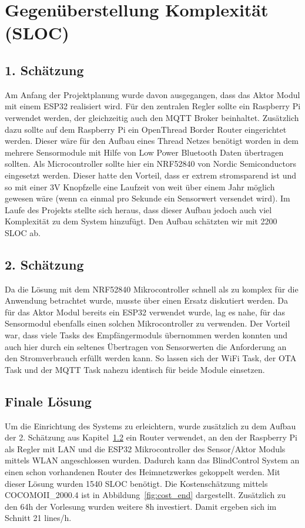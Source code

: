 \section{Gegenüberstellung Komplexität (SLOC)}
\subsection{1. Schätzung}
Am Anfang der Projektplanung wurde davon ausgegangen, dass das Aktor Modul mit einem ESP32 realisiert wird. Für den zentralen Regler sollte ein Raspberry Pi verwendet werden, der gleichzeitig auch den MQTT Broker beinhaltet. Zusätzlich dazu sollte auf dem Raspberry Pi ein OpenThread Border Router eingerichtet werden. Dieser wäre für den Aufbau eines Thread Netzes benötigt worden in dem mehrere Sensormodule mit Hilfe von Low Power Bluetooth Daten übertragen sollten. Als Microcontroller sollte hier ein NRF52840 von Nordic Semiconductors eingesetzt werden. Dieser hatte den Vorteil, dass er extrem stromsparend ist und so mit einer 3V Knopfzelle eine Laufzeit von weit über einem Jahr möglich gewesen wäre (wenn ca einmal pro Sekunde ein Sensorwert versendet wird). Im Laufe des Projekts stellte sich heraus, dass dieser Aufbau jedoch auch viel Komplexität zu dem System hinzufügt. Den Aufbau schätzten wir mit 2200 SLOC ab.
\subsection{2. Schätzung}
\label{cha:projektplanung_2schaetzung}
Da die Lösung mit dem NRF52840 Mikrocontroller schnell als zu komplex für die Anwendung betrachtet wurde, musste über einen Ersatz diskutiert werden. Da für das Aktor Modul bereits ein ESP32 verwendet wurde, lag es nahe, für das Sensormodul ebenfalls einen solchen Mikrocontroller zu verwenden. Der Vorteil war, dass viele Tasks des Empfängermoduls übernommen werden konnten und auch hier durch ein seltenes Übertragen von Sensorwerten die Anforderung an den Stromverbrauch erfüllt werden kann. So lassen sich der WiFi Task, der OTA Task und der MQTT Task nahezu identisch für beide Module einsetzen.
\subsection{Finale Lösung}
Um die Einrichtung des Systems zu erleichtern, wurde zusätzlich zu dem Aufbau der 2. Schätzung aus Kapitel~\ref{cha:projektplanung_2schaetzung} ein Router verwendet, an den der Raspberry Pi als Regler mit LAN und die ESP32 Mikrocontroller des Sensor/Aktor Moduls mittels WLAN angeschlossen wurden. Dadurch kann das BlindControl System an einen schon vorhandenen Router des Heimnetzwerkes gekoppelt werden. Mit dieser Lösung wurden 1540 SLOC benötigt. Die Kostenschätzung mittels COCOMOII\_2000.4 ist in Abbildung~\ref{fig:cost_end} dargestellt. Zusätzlich zu den 64h der Vorlesung wurden weitere 8h investiert. Damit ergeben sich im Schnitt 21 lines/h. 

